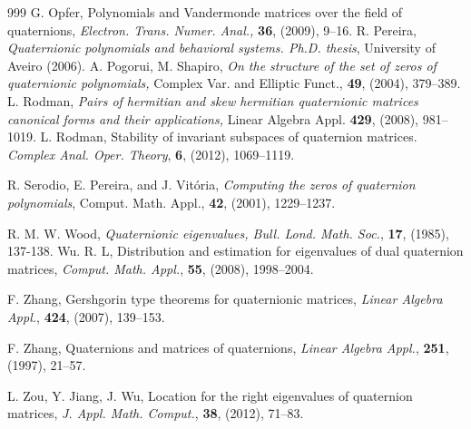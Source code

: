 \documentclass [12pt]{article}
\begin{document}
\begin{thebibliography}{999}
 G. Opfer, Polynomials and Vandermonde matrices over the field of quaternions, \textit{Electron. Trans. Numer. Anal.,} \textbf{36}, (2009), 9–16.
R. Pereira, \textit{Quaternionic polynomials and behavioral systems. Ph.D. thesis}, University of Aveiro (2006).
 A. Pogorui, M. Shapiro, \textit{On the structure of the set of zeros of quaternionic polynomials,} Complex Var. and Elliptic Funct., \textbf{49}, (2004),
379–389.
 L. Rodman, \textit{Pairs of hermitian and skew hermitian quaternionic matrices canonical forms and their applications, } Linear Algebra
Appl. \textbf{429}, (2008), 981–1019.
L. Rodman, Stability of invariant subspaces of quaternion matrices. \textit{Complex Anal. Oper. Theory}, \textbf{6}, (2012), 1069--1119.

R. Serodio, E. Pereira, and J. Vitória, 
\textit{Computing the zeros of quaternion polynomials}, 
Comput. Math. Appl., \textbf{42}, (2001), 1229--1237.



 R. M. W. Wood, \textit{Quaternionic eigenvalues, Bull. Lond. Math. Soc.}, \textbf{17}, (1985), 137-138.
  Wu. R. L, 
Distribution and estimation for eigenvalues of dual quaternion matrices, 
\textit{Comput. Math. Appl.}, \textbf{55}, (2008), 1998--2004.


F. Zhang, 
Gershgorin type theorems for quaternionic matrices, 
\textit{Linear Algebra Appl.}, \textbf{424}, (2007), 139--153.


F. Zhang, 
Quaternions and matrices of quaternions, 
\textit{Linear Algebra Appl.}, \textbf{251}, (1997), 21--57.



L. Zou, Y. Jiang, J. Wu, 
Location for the right eigenvalues of quaternion matrices, 
\textit{J. Appl. Math. Comput.}, \textbf{38}, (2012), 71--83.


\end{thebibliography}
\end{document}
